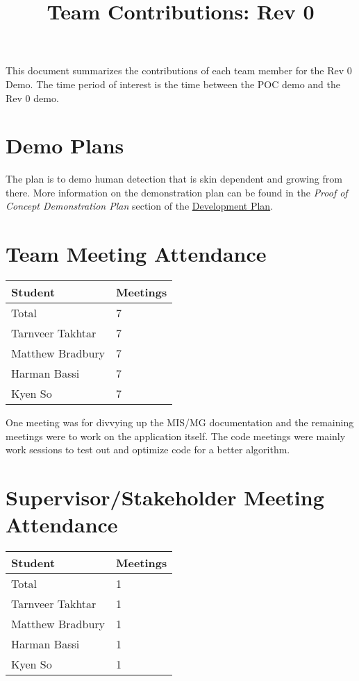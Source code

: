 \documentclass{article}
\title{Team Contributions: Rev 0\\\progname}
\author{\authname}
\date{}
\begin{document}
\maketitle

This document summarizes the contributions of each team member for the Rev 0
Demo.  The time period of interest is the time between the POC demo and the Rev
0 demo.

\section{Demo Plans}

The plan is to demo human detection that is skin dependent and growing from there.
More information on the demonstration plan can be found in the \textit{Proof of Concept Demonstration Plan} section of the \href{https://github.com/takhtart/PCD/blob/main/docs/DevelopmentPlan/DevelopmentPlan.pdf}{Development Plan}.


\section{Team Meeting Attendance}

\begin{table}[H]
\centering
\begin{tabular}{ll}
\toprule
\textbf{Student} & \textbf{Meetings}\\
\midrule
Total & 7\\
Tarnveer Takhtar & 7\\
Matthew Bradbury & 7\\
Harman Bassi & 7\\
Kyen So & 7\\
\bottomrule
\end{tabular}
\end{table}

One meeting was for divvying up the MIS/MG documentation and the remaining meetings were to work on the application itself.
The code meetings were mainly work sessions to test out and optimize code for a better algorithm. 

\section{Supervisor/Stakeholder Meeting Attendance}

\begin{table}[H]
\centering
\begin{tabular}{ll}
\toprule
\textbf{Student} & \textbf{Meetings}\\
\midrule
Total & 1\\
Tarnveer Takhtar & 1\\
Matthew Bradbury & 1\\
Harman Bassi & 1\\
Kyen So & 1\\
\bottomrule
\end{tabular}
\end{table}
\end{document}
